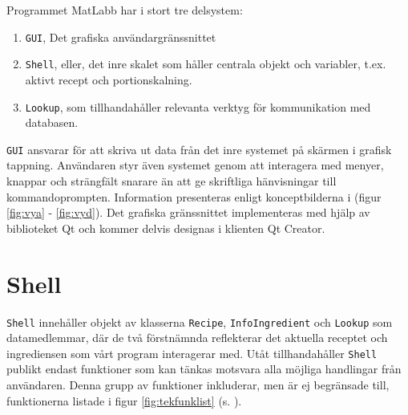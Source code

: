 Programmet MatLabb har i stort tre delsystem:

\begin{enumerate}
\item \verb+GUI+, Det grafiska användargränssnittet
\item \verb+Shell+, eller, det inre skalet som håller centrala objekt och variabler, t.ex. aktivt recept och portionskalning.
\item \verb+Lookup+, som tillhandahåller relevanta verktyg för kommunikation med databasen.
\end{enumerate}
\verb+GUI+ ansvarar för att skriva ut data från det inre systemet på skärmen i grafisk tappning. Användaren styr även systemet genom att interagera med menyer, knappar och strängfält snarare än att ge skriftliga hänvisningar till kommandoprompten. Information presenteras enligt konceptbilderna i (figur \ref{fig:vya} - \ref{fig:vyd}). Det grafiska gränssnittet implementeras med hjälp av biblioteket Qt och kommer delvis designas i klienten Qt Creator.

\section{Shell}
\verb+Shell+ innehåller objekt av klasserna \verb+Recipe+, \verb+InfoIngredient+ och \verb+Lookup+ som datamedlemmar, där de två förstnämnda reflekterar det aktuella receptet och ingrediensen som vårt program interagerar med. Utåt tillhandahåller \verb+Shell+ publikt endast funktioner som kan tänkas motsvara alla möjliga handlingar från användaren. Denna grupp av funktioner inkluderar, men är ej begränsade till, funktionerna listade i figur \ref{fig:tekfunklist} (s. \pageref{fig:tekfunklist}).

